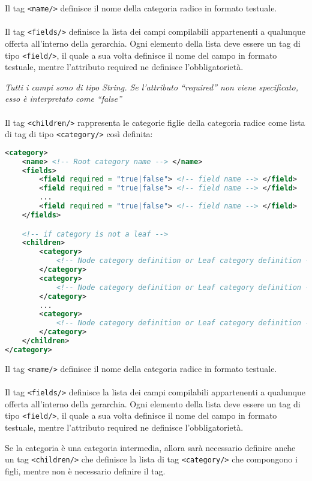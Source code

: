 Il tag \verb|<name/>| definisce il nome della categoria radice in formato testuale.
\\\\
Il tag \verb|<fields/>| definisce la lista dei campi compilabili appartenenti a qualunque offerta all'interno della gerarchia.
Ogni elemento della lista deve essere un tag di tipo \verb|<field/>|, il quale a sua volta definisce il nome del campo in formato testuale, mentre l'attributo required ne definisce l'obbligatorietà.

\textit{Tutti i campi sono di tipo String. Se l'attributo ``required'' non viene specificato, esso è interpretato come ``false''}
\\\\
Il tag \verb|<children/>| rappresenta le categorie figlie della categoria radice come lista di tag di tipo \verb|<category/>| così definita:

\begin{lstlisting}[language=XML]
<category>
    <name> <!-- Root category name --> </name>
    <fields>
        <field required = "true|false"> <!-- field name --> </field>
        <field required = "true|false"> <!-- field name --> </field>
        ...
        <field required = "true|false"> <!-- field name --> </field>
    </fields>

    <!-- if category is not a leaf -->
    <children>
        <category>
            <!-- Node category definition or Leaf category definition -->
        </category>
        <category>
            <!-- Node category definition or Leaf category definition -->
        </category>
        ...
        <category>
            <!-- Node category definition or Leaf category definition -->
        </category>
    </children>
</category>
\end{lstlisting}
    

Il tag \verb|<name/>| definisce il nome della categoria radice in formato testuale.
\\\\
Il tag \verb|<fields/>| definisce la lista dei campi compilabili appartenenti a qualunque offerta all'interno della gerarchia.
Ogni elemento della lista deve essere un tag di tipo \verb|<field/>|, il quale a sua volta definisce il nome del campo in formato testuale, mentre l'attributo required ne definisce l'obbligatorietà.

Se la categoria è una categoria intermedia, allora sarà necessario definire anche un tag \verb|<children/>| che definisce la lista di tag \verb|<category/>| che compongono i figli, mentre non è necessario definire il tag.
